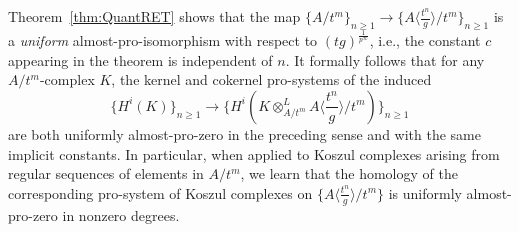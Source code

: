 \documentclass[10pt,reqno]{amsart}
\begin{document}
%
%
%

\begin{remark}
Theorem~\ref{thm:QuantRET} shows that the map $\{ A/t^m \}_{n \geq 1} \to \{A \langle \frac{t^n}{g} \rangle/t^m\}_{n \geq 1}$ is a {\em uniform} almost-pro-isomorphism with respect to $(tg)^{\frac{1}{p^\infty}}$, i.e., the constant $c$ appearing in the theorem is independent of $n$. It formally follows that for any $A/t^m$-complex $K$, the kernel and cokernel pro-systems of the induced 
\[ \{ H^i(K) \}_{n \geq 1} \to \{H^i(K \otimes^L_{A/t^m} A \langle \frac{t^n}{g} \rangle/t^m)\}_{n \geq 1}\]
are both uniformly almost-pro-zero in the preceding sense and with the same implicit constants. In particular, when applied to Koszul complexes arising from regular sequences of elements in $A/t^m$, we learn that the homology of the corresponding pro-system of Koszul complexes on $\{A \langle \frac{t^n}{g} \rangle/t^m\}$ is uniformly almost-pro-zero in nonzero degrees.
\end{remark}
\end{document}
